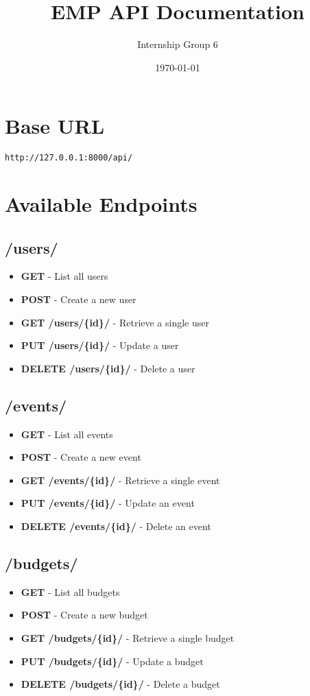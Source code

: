 \documentclass{article}
\title{EMP API Documentation}
\author{Internship Group 6}
\date{\today}
\begin{document}
\maketitle

\section*{Base URL}
\texttt{http://127.0.0.1:8000/api/}

\section*{Available Endpoints}

\subsection*{/users/}
\begin{itemize}
  \item \textbf{GET} - List all users
  \item \textbf{POST} - Create a new user
  \item \textbf{GET /users/\{id\}/} - Retrieve a single user
  \item \textbf{PUT /users/\{id\}/} - Update a user
  \item \textbf{DELETE /users/\{id\}/} - Delete a user
\end{itemize}

\subsection*{/events/}
\begin{itemize}
  \item \textbf{GET} - List all events
  \item \textbf{POST} - Create a new event
  \item \textbf{GET /events/\{id\}/} - Retrieve a single event
  \item \textbf{PUT /events/\{id\}/} - Update an event
  \item \textbf{DELETE /events/\{id\}/} - Delete an event
\end{itemize}

\subsection*{/budgets/}
\begin{itemize}
  \item \textbf{GET} - List all budgets
  \item \textbf{POST} - Create a new budget
  \item \textbf{GET /budgets/\{id\}/} - Retrieve a single budget
  \item \textbf{PUT /budgets/\{id\}/} - Update a budget
  \item \textbf{DELETE /budgets/\{id\}/} - Delete a budget
\end{itemize}
\end{document}
